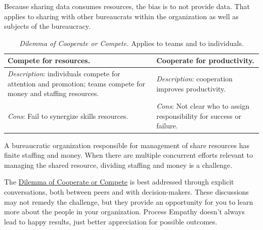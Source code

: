 Because sharing data consumes resources, the bias is to not provide data. That applies to sharing with other bureaucrats within the organization as well as subjects of the bureaucracy. 


\begin{center}
\begin{table}[H] %
\begin{tabular}{ | m{\dilemmatablewidth}| m{\dilemmatablewidth} | } 
  \hline
  \textbf{Compete for resources.} &
  \textbf{Cooperate for productivity.} \\
  \hline
  \textit{Description}: individuals compete for attention and promotion; teams compete for money and staffing resources. &
  \textit{Description}: cooperation improves productivity. \\  
  \hline
  \textit{Cons}: Fail to synergize skills resources. & 
  \textit{Cons}: Not clear who to assign responsibility for success or failure. \\
  \hline
\end{tabular}
\caption{
\textit{Dilemma of Cooperate or Compete.} 
Applies to teams and to individuals. 
}
\label{table:dilemma-personal-cooperate-vs-compete}
\end{table}
\end{center}


A bureaucratic organization responsible for management of share resources has finite staffing and money. When there are multiple concurrent efforts relevant to managing the shared resource,  dividing staffing and money is a challenge. 

The \hyperref[table:dilemma-personal-cooperate-vs-compete]{Dilemma of Cooperate or Compete} 
\iftoggle{printedonpaper}{ (\ref{table:dilemma-personal-cooperate-vs-compete})}{} is best addressed through explicit conversations,
both between peers and with decision-makers. These discussions may not remedy the challenge, but they provide an opportunity for you to learn more about the people in your organization. Process Empathy doesn't always lead to happy results, just better appreciation for possible outcomes.

